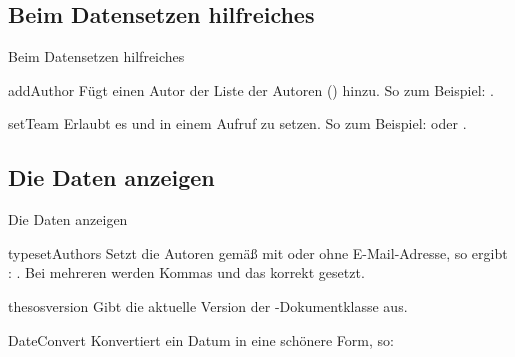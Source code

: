 \documentclass{sopra-seraphim}
\begin{document}
    \subsection{Beim Datensetzen hilfreiches}
    \begin{frame}[fragile]{Beim Datensetzen hilfreiches}
    \begin{command}{addAuthor}{}
        Fügt einen Autor der Liste der Autoren () hinzu. So zum
        Beispiel: .
    \end{command}

    \begin{command}{setTeam}{}
        Erlaubt es  und  in einem Aufruf zu setzen.
        So zum Beispiel:  oder
        .
    \end{command}
    \end{frame}

    
\subsection{Die Daten anzeigen}

\begin{frame}{Die Daten anzeigen}
    \begin{command}{typesetAuthors}{}
        Setzt die Autoren gemäß  mit oder
        ohne E-Mail-Adresse, so ergibt : \typesetAuthors.
        Bei mehreren werden Kommas und das  korrekt gesetzt.
    \end{command}

    \begin{command}{thesosversion}{}
        Gibt die aktuelle Version der -Dokumentklasse aus. 
    \end{command}

    \begin{command}{DateConvert}{}
        Konvertiert ein Datum in eine schönere Form, so:
    \begin{plainlatex}[morekeywords={[5]{\\DateConvert}}]
    \end{plainlatex}
    \end{command}
\end{frame}
        
\end{document}
